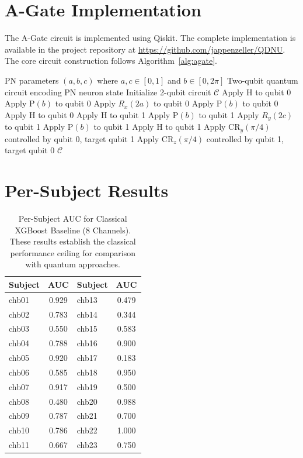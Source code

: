 \documentclass[pdflatex,sn-mathphys-num]{sn-jnl}
\begin{document}
\begin{appendices}
\section{A-Gate Implementation}
\label{app:implementation}

The A-Gate circuit is implemented using Qiskit. The complete implementation is available in the project repository at \url{https://github.com/jappenzeller/QDNU}. The core circuit construction follows Algorithm~\ref{alg:agate}.

\begin{algorithm}[htbp]
\caption{A-Gate Circuit Construction}
\label{alg:agate}
\begin{algorithmic}[1]
\Require PN parameters $(a, b, c)$ where $a, c \in [0, 1]$ and $b \in [0, 2\pi]$
\Ensure Two-qubit quantum circuit encoding PN neuron state
\State Initialize 2-qubit circuit $\mathcal{C}$
\State {}
\State Apply H to qubit 0
\State Apply P$(b)$ to qubit 0
\State Apply $R_x(2a)$ to qubit 0
\State Apply P$(b)$ to qubit 0
\State Apply H to qubit 0
\State {}
\State Apply H to qubit 1
\State Apply P$(b)$ to qubit 1
\State Apply $R_y(2c)$ to qubit 1
\State Apply P$(b)$ to qubit 1
\State Apply H to qubit 1
\State {}
\State Apply CR$_y(\pi/4)$ controlled by qubit 0, target qubit 1
\State Apply CR$_z(\pi/4)$ controlled by qubit 1, target qubit 0
\State \Return $\mathcal{C}$
\end{algorithmic}
\end{algorithm}

\section{Per-Subject Results}
\label{app:subjects}

\begin{table}[htbp]
\centering
\caption{Per-Subject AUC for Classical XGBoost Baseline (8 Channels). These results establish the classical performance ceiling for comparison with quantum approaches.}
\label{tab:subjects}
\small
\begin{tabular}{lclc}
\toprule
Subject & AUC & Subject & AUC \\
\midrule
chb01 & 0.929 & chb13 & 0.479 \\
chb02 & 0.783 & chb14 & 0.344 \\
chb03 & 0.550 & chb15 & 0.583 \\
chb04 & 0.788 & chb16 & 0.900 \\
chb05 & 0.920 & chb17 & 0.183 \\
chb06 & 0.585 & chb18 & 0.950 \\
chb07 & 0.917 & chb19 & 0.500 \\
chb08 & 0.480 & chb20 & 0.988 \\
chb09 & 0.787 & chb21 & 0.700 \\
chb10 & 0.786 & chb22 & 1.000 \\
chb11 & 0.667 & chb23 & 0.750 \\
\bottomrule
\end{tabular}
\end{table}

\end{appendices}
\end{document}
